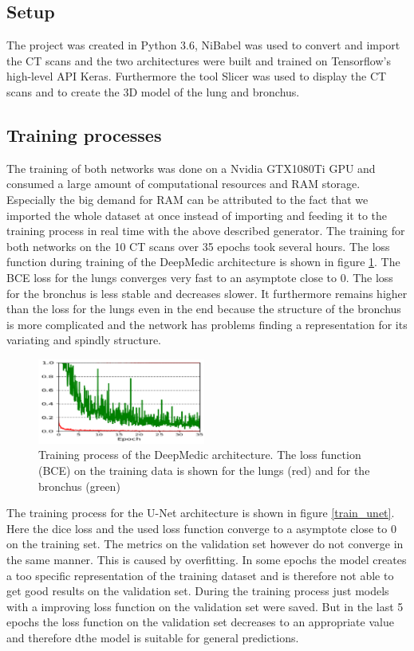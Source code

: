 
\subsection{Setup}

The project was created in Python 3.6, NiBabel was used to convert and import the CT scans and the two architectures were built and trained on Tensorflow's high-level API Keras. Furthermore the tool Slicer was used to display the CT scans and to create the 3D model of the lung and bronchus.

\subsection{Training processes}
The training of both networks was done on a Nvidia GTX1080Ti GPU and consumed a large amount of computational resources and RAM storage. Especially the big demand for RAM can be attributed to the fact that we imported the whole dataset at once instead of importing and feeding it to the training process in real time with the above described generator. The training for both networks on the 10 CT scans over 35 epochs took several hours.\newline 
The loss function during training of the DeepMedic architecture is shown in figure \ref{train_deepmedic}. The BCE loss for the lungs converges very fast to an asymptote close to 0. The loss for the bronchus is less stable and decreases slower. It furthermore remains higher than the loss for the lungs even in the end because the structure of the bronchus is more complicated and the network has problems finding a representation for its variating and spindly structure.\newline
\begin{figure}[h!]
	\includegraphics[width=0.49\textwidth, angle=0]{files/deepmedictrain.png}
	\caption{Training process of the DeepMedic architecture. The loss function (BCE) on the training data is shown for the lungs (red) and for the bronchus (green)}
	\label{train_deepmedic}
\end{figure}

The training process for the U-Net architecture is shown in figure \ref{train_unet}. Here the dice loss and the used loss function converge to a asymptote close to 0 on the training set. The metrics on the validation set however do not converge in the same manner. This is caused by overfitting. In some epochs the model creates a too specific representation of the training dataset and is therefore not able to get good results on the validation set. During the training process just models with a improving loss function on the validation set were saved. But in the last 5 epochs the loss function on the validation set decreases to an appropriate value and therefore dthe model is suitable for general predictions. 

